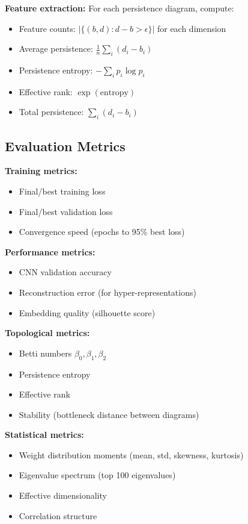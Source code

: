 \textbf{Feature extraction:}
For each persistence diagram, compute:
\begin{itemize}
    \item Feature counts: $|\{(b,d) : d - b > \epsilon\}|$ for each dimension
    \item Average persistence: $\frac{1}{n}\sum_i (d_i - b_i)$
    \item Persistence entropy: $-\sum_i p_i \log p_i$
    \item Effective rank: $\exp(\text{entropy})$
    \item Total persistence: $\sum_i (d_i - b_i)$
\end{itemize}

\subsection{Evaluation Metrics}

\textbf{Training metrics:}
\begin{itemize}
    \item Final/best training loss
    \item Final/best validation loss
    \item Convergence speed (epochs to 95\% best loss)
\end{itemize}

\textbf{Performance metrics:}
\begin{itemize}
    \item CNN validation accuracy
    \item Reconstruction error (for hyper-representations)
    \item Embedding quality (silhouette score)
\end{itemize}

\textbf{Topological metrics:}
\begin{itemize}
    \item Betti numbers $\beta_0, \beta_1, \beta_2$
    \item Persistence entropy
    \item Effective rank
    \item Stability (bottleneck distance between diagrams)
\end{itemize}

\textbf{Statistical metrics:}
\begin{itemize}
    \item Weight distribution moments (mean, std, skewness, kurtosis)
    \item Eigenvalue spectrum (top 100 eigenvalues)
    \item Effective dimensionality
    \item Correlation structure
\end{itemize}

